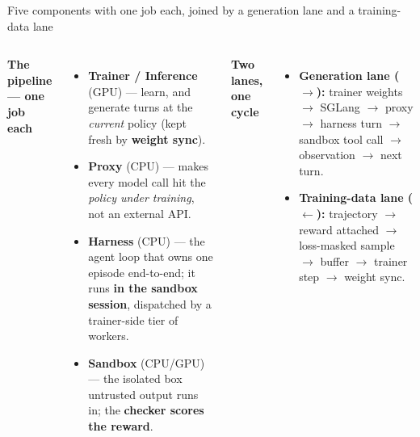 \begin{frame}{Five components with one job each, joined by a generation lane and a training-data lane}
\begin{columns}[T]
{\footnotesize\textbf{The pipeline --- one job each}\par}
\begin{itemize}\footnotesize\setlength{\itemsep}{1mm}
\item \textbf{Trainer / Inference} (GPU) --- learn, and generate turns at the \emph{current} policy (kept fresh by \textbf{weight sync}).
\item \textbf{Proxy} (CPU) --- makes every model call hit the \emph{policy under training}, not an external API.
\item \textbf{Harness} (CPU) --- the agent loop that owns one episode end-to-end; it runs \textbf{in the sandbox session}, dispatched by a trainer-side tier of  workers.
\item \textbf{Sandbox} (CPU/GPU) --- the isolated box untrusted output runs in; the \textbf{checker scores the reward}.
\end{itemize}
{\footnotesize\textbf{Two lanes, one cycle}\par}
\begin{itemize}\footnotesize\setlength{\itemsep}{1mm}
\item \textbf{Generation lane ($\rightarrow$):} trainer weights $\rightarrow$ SGLang $\rightarrow$ proxy $\rightarrow$ harness turn $\rightarrow$ sandbox tool call $\rightarrow$ observation $\rightarrow$ next turn.
\item \textbf{Training-data lane ($\leftarrow$):} trajectory $\rightarrow$ reward attached $\rightarrow$ loss-masked sample $\rightarrow$ buffer $\rightarrow$ trainer step $\rightarrow$ weight sync.
\end{itemize}
\vspace{2mm}
\end{columns}
\end{frame}

